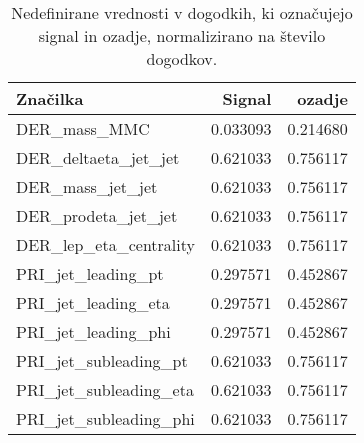 \begin{table}[ht]
	\centering
	\begin{tabular}{lrr}
		\hline
		\textbf{Značilka} &         \textbf{Signal} &         \textbf{ozadje} \\
		\hline
		DER\_mass\_MMC           &  0.033093 &  0.214680 \\
		DER\_deltaeta\_jet\_jet   &  0.621033 &  0.756117 \\
		DER\_mass\_jet\_jet       &  0.621033 &  0.756117 \\
		DER\_prodeta\_jet\_jet    &  0.621033 &  0.756117 \\
		DER\_lep\_eta\_centrality &  0.621033 &  0.756117 \\
		PRI\_jet\_leading\_pt     &  0.297571 &  0.452867 \\
		PRI\_jet\_leading\_eta    &  0.297571 &  0.452867 \\
		PRI\_jet\_leading\_phi    &  0.297571 &  0.452867 \\
		PRI\_jet\_subleading\_pt  &  0.621033 &  0.756117 \\
		PRI\_jet\_subleading\_eta &  0.621033 &  0.756117 \\
		PRI\_jet\_subleading\_phi &  0.621033 &  0.756117 \\
	\end{tabular}
	\caption{Nedefinirane vrednosti v dogodkih, ki označujejo signal in ozadje, normalizirano na število dogodkov.}
	\label{unknown_values}
\end{table}
